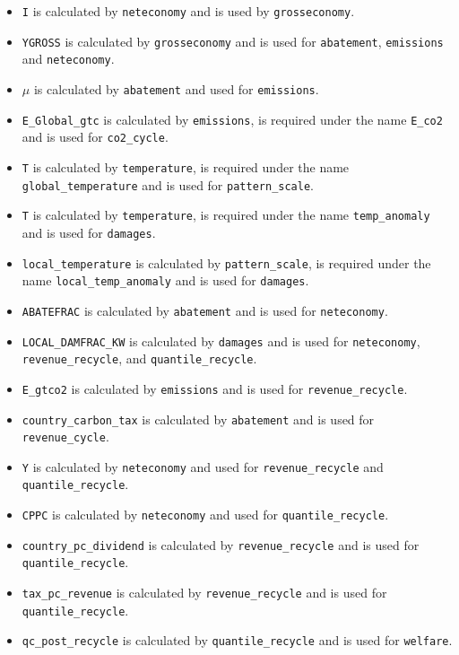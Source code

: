 \documentclass[
]{article}
\providecommand{\tightlist}{%
  \setlength{\itemsep}{0pt}\setlength{\parskip}{0pt}}
\begin{document}
\begin{itemize}
\tightlist
\item
  \texttt{I} is calculated by \texttt{neteconomy} and is used by
  \texttt{grosseconomy}.
\item
  \texttt{YGROSS} is calculated by \texttt{grosseconomy} and is used for
  \texttt{abatement}, \texttt{emissions} and \texttt{neteconomy}.
\item
  \(\mu\) is calculated by \texttt{abatement} and used for
  \texttt{emissions}.
\item
  \texttt{E\_Global\_gtc} is calculated by \texttt{emissions}, is
  required under the name \texttt{E\_co2} and is used for
  \texttt{co2\_cycle}.
\item
  \texttt{T} is calculated by \texttt{temperature}, is required under
  the name \texttt{global\_temperature} and is used for
  \texttt{pattern\_scale}.
\item
  \texttt{T} is calculated by \texttt{temperature}, is required under
  the name \texttt{temp\_anomaly} and is used for \texttt{damages}.
\item
  \texttt{local\_temperature} is calculated by \texttt{pattern\_scale},
  is required under the name \texttt{local\_temp\_anomaly} and is used
  for \texttt{damages}.
\item
  \texttt{ABATEFRAC} is calculated by \texttt{abatement} and is used for
  \texttt{neteconomy}.
\item
  \texttt{LOCAL\_DAMFRAC\_KW} is calculated by \texttt{damages} and is
  used for \texttt{neteconomy}, \texttt{revenue\_recycle}, and
  \texttt{quantile\_recycle}.
\item
  \texttt{E\_gtco2} is calculated by \texttt{emissions} and is used for
  \texttt{revenue\_recycle}.
\item
  \texttt{country\_carbon\_tax} is calculated by \texttt{abatement} and
  is used for \texttt{revenue\_cycle}.
\item
  \texttt{Y} is calculated by \texttt{neteconomy} and used for
  \texttt{revenue\_recycle} and \texttt{quantile\_recycle}.
\item
  \texttt{CPPC} is calculated by \texttt{neteconomy} and used for
  \texttt{quantile\_recycle}.
\item
  \texttt{country\_pc\_dividend} is calculated by
  \texttt{revenue\_recycle} and is used for \texttt{quantile\_recycle}.
\item
  \texttt{tax\_pc\_revenue} is calculated by \texttt{revenue\_recycle}
  and is used for \texttt{quantile\_recycle}.
\item
  \texttt{qc\_post\_recycle} is calculated by \texttt{quantile\_recycle}
  and is used for \texttt{welfare}.
\end{itemize}
\end{document}
